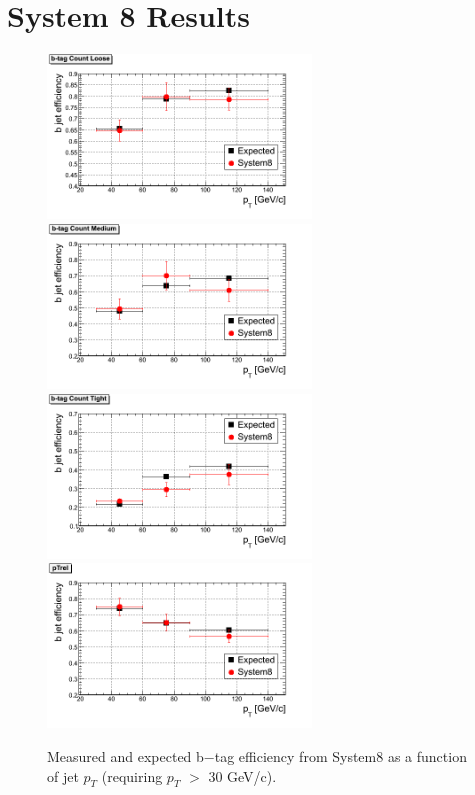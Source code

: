 \section{System 8 Results}
\begin{figure}[htbp]
  \begin{center}
    \includegraphics[width=70mm]{Figures/TCL_Tag.png}
    \includegraphics[width=70mm]{Figures/TCM_Tag.png}
    \includegraphics[width=70mm]{Figures/TCT_Tag.png}
    \includegraphics[width=70mm]{Figures/pTrel.png}
  \end{center}
  \caption{Measured and expected b$-$tag efficiency from System8 as a function of jet $p_T $ (requiring $p_T $ $> $ 30 GeV/c).}
  \label{fig:S8_TC_results}
\end{figure}


